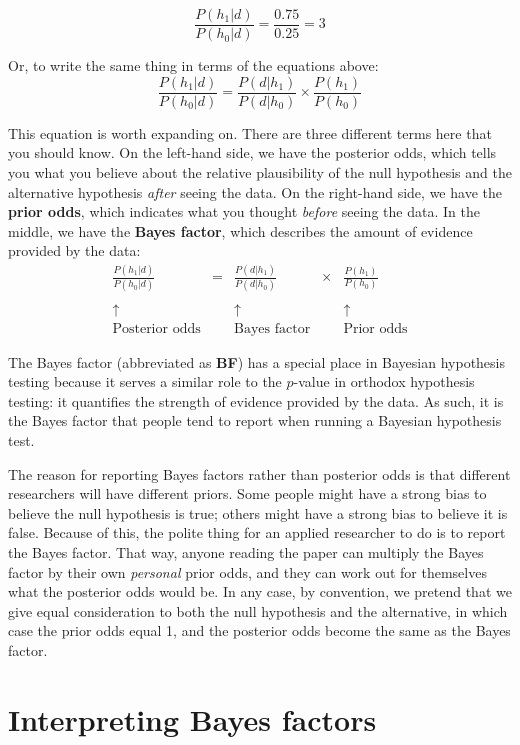 \documentclass[
  11pt,
  a4paper,
  twoside,symmetric,openright]{book}
\theoremstyle{break}
\theoremstyle{break}
\begin{document}
\[
\frac{P(h_1 | d)}{P(h_0 | d)} = \frac{0.75}{0.25} = 3
\]

Or, to write the same thing in terms of the equations above:
\[
\frac{P(h_1 | d)}{P(h_0 | d)} = \frac{P(d|h_1)}{P(d|h_0)} \times \frac{P(h_1)}{P(h_0)}
\]

This equation is worth expanding on. There are three different terms here that you should know. On the left-hand side, we have the posterior odds, which tells you what you believe about the relative plausibility of the null hypothesis and the alternative hypothesis \emph{after} seeing the data. On the right-hand side, we have the \textbf{prior odds}, which indicates what you thought \emph{before} seeing the data. In the middle, we have the \textbf{Bayes factor}, which describes the amount of evidence provided by the data:
\[
\begin{array}{ccccc}\displaystyle
\frac{P(h_1 | d)}{P(h_0 | d)} &=& \displaystyle\frac{P(d|h_1)}{P(d|h_0)} &\times& \displaystyle\frac{P(h_1)}{P(h_0)} \\[6pt] \\[-2pt]
\uparrow && \uparrow && \uparrow \\[6pt]
\mbox{Posterior odds} && \mbox{Bayes factor} && \mbox{Prior odds}
\end{array}
\]

The Bayes factor (abbreviated as \textbf{BF}) has a special place in Bayesian hypothesis testing because it serves a similar role to the \(p\)-value in orthodox hypothesis testing: it quantifies the strength of evidence provided by the data. As such, it is the Bayes factor that people tend to report when running a Bayesian hypothesis test.

The reason for reporting Bayes factors rather than posterior odds is that different researchers will have different priors. Some people might have a strong bias to believe the null hypothesis is true; others might have a strong bias to believe it is false. Because of this, the polite thing for an applied researcher to do is to report the Bayes factor. That way, anyone reading the paper can multiply the Bayes factor by their own \emph{personal} prior odds, and they can work out for themselves what the posterior odds would be. In any case, by convention, we pretend that we give equal consideration to both the null hypothesis and the alternative, in which case the prior odds equal 1, and the posterior odds become the same as the Bayes factor.

\section{Interpreting Bayes factors}\label{interpreting-bayes-factors}
\end{document}
